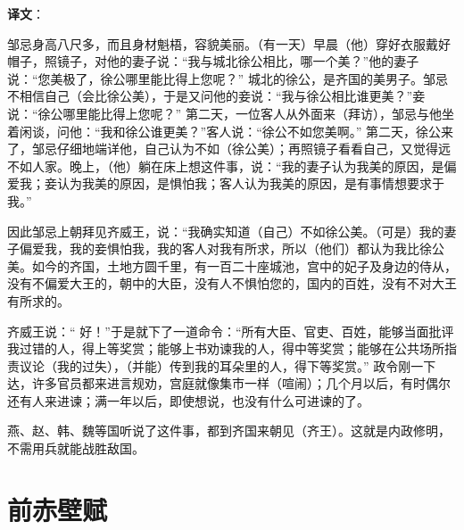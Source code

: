 \documentclass[12pt,UTF-8,openany]{ctexbook}
\begin{document}
\textbf{译文}：

\vspace{1em}

\begin{normalsize}
    
    邹忌身高八尺多，而且身材魁梧，容貌美丽。（有一天）早晨（他）穿好衣服戴好 帽子，照镜子，对他的妻子说：“我与城北徐公相比，哪一个美？”他的妻子说：“您美极了，徐公哪里能比得上您呢？” 城北的徐公，是齐国的美男子。邹忌不相信自己（会比徐公美），于是又问他的妾说：“我与徐公相比谁更美？”妾说：“徐公哪里能比得上您呢？” 第二天，一位客人从外面来（拜访），邹忌与他坐着闲谈，问他：“我和徐公谁更美？”客人说：“徐公不如您美啊。” 第二天，徐公来了，邹忌仔细地端详他，自己认为不如（徐公美）；再照镜子看看自己，又觉得远不如人家。晚上，（他）躺在床上想这件事，说：“我的妻子认为我美的原因，是偏爱我；妾认为我美的原因，是惧怕我；客人认为我美的原因，是有事情想要求于我。”
    
    因此邹忌上朝拜见齐威王，说：“我确实知道（自己）不如徐公美。（可是）我的妻子偏爱我，我的妾惧怕我，我的客人对我有所求，所以（他们）都认为我比徐公美。如今的齐国，土地方圆千里，有一百二十座城池，宫中的妃子及身边的侍从，没有不偏爱大王的，朝中的大臣，没有人不惧怕您的，国内的百姓，没有不对大王有所求的。
    
    齐威王说：“ 好！”于是就下了一道命令：“所有大臣、官吏、百姓，能够当面批评我过错的人，得上等奖赏；能够上书劝谏我的人，得中等奖赏；能够在公共场所指责议论（我的过失），（并能）传到我的耳朵里的人，得下等奖赏。” 政令刚一下达，许多官员都来进言规劝，宫庭就像集市一样（喧闹）；几个月以后，有时偶尔还有人来进谏；满一年以后，即使想说，也没有什么可进谏的了。
    
    燕、赵、韩、魏等国听说了这件事，都到齐国来朝见（齐王）。这就是内政修明，不需用兵就能战胜敌国。
    
\end{normalsize}



\chapter{前赤壁赋}
\end{document}
